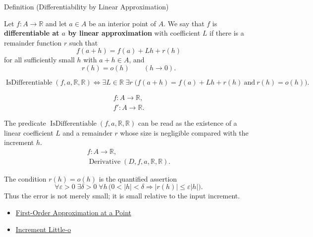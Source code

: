 \begin{definitionbox}{Definition (Differentiability by Linear Approximation)}
\begin{definition}
\label{def:differentiability-linear-approximation}
Let $f:A\to\mathbb{R}$ and let $a\in A$ be an interior point of $A$. We say
that $f$ is \textbf{differentiable at $a$ by linear approximation} with
coefficient $L$ if there is a remainder function $r$ such that
\[
  f(a+h)=f(a)+Lh+r(h)
\]
for all sufficiently small $h$ with $a+h\in A$, and
\[
  r(h)=o(h)\qquad (h\to 0).
\]
\end{definition}
\end{definitionbox}

\begin{remark*}
\[
\operatorname{IsDifferentiable}(f,a,\mathbb{R},\mathbb{R})
\Longleftrightarrow
\exists L\in\mathbb{R}\;\exists r\;
\bigl(f(a+h)=f(a)+Lh+r(h)\ \text{and}\ r(h)=o(h)\bigr).
\]
\end{remark*}

\begin{remark*}
\[
\begin{aligned}
  f\colon A\to\mathbb{R},\\
  f'\colon A\to\mathbb{R}.
\end{aligned}
\]

The predicate $\operatorname{IsDifferentiable}(f,a,\mathbb{R},\mathbb{R})$ can be read as the
existence of a linear coefficient $L$ and a remainder $r$ whose size is
negligible compared with the increment $h$.
\[
\begin{aligned}
  f\colon A\to\mathbb{R},\\
  \operatorname{Derivative}(D,f,a,\mathbb{R},\mathbb{R}).
\end{aligned}
\]
\end{remark*}

\begin{remark*}[Interpretation]
The condition $r(h)=o(h)$ is the quantified assertion
\[
  \forall\varepsilon>0\;\exists\delta>0\;\forall h\,
  \bigl(0<|h|<\delta
  \Rightarrow |r(h)|\leq \varepsilon |h|\bigr).
\]
Thus the error is not merely small; it is small relative to the input
increment.
\end{remark*}

\begin{dependencies}
\begin{itemize}
  \item \hyperref[def:first-order-approximation-at-a-point]{First-Order Approximation at a Point}
  \item \hyperref[def:increment-little-o]{Increment Little-o}
\end{itemize}
\end{dependencies}


